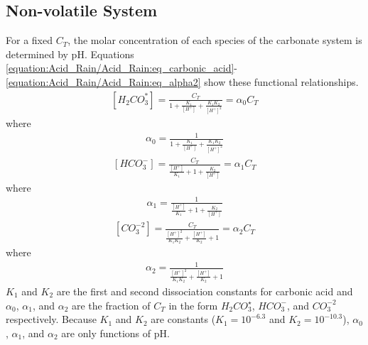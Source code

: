 \documentclass[letterpaper,10pt,english]{sphinxmanual}
\begin{document}
\subsection{Non-volatile System}
\label{\detokenize{Acid_Rain/Acid_Rain:non-volatile-system}}
For a fixed \(C_T\), the molar concentration of each species of the carbonate system is determined by pH. Equations \eqref{equation:Acid_Rain/Acid_Rain:eq_carbonic_acid}-\eqref{equation:Acid_Rain/Acid_Rain:eq_alpha2} show these functional relationships.
\begin{equation}\label{equation:Acid_Rain/Acid_Rain:eq_carbonic_acid}
\begin{split}\left[H_2 {CO}_3^* \right] = \frac{C_T}{1+\frac{K_1}{[H^+]} +\frac{K_1 K_2}{[H^+]^2} } = \alpha_0 C_T\end{split}
\end{equation}
where
\begin{equation}\label{equation:Acid_Rain/Acid_Rain:eq_alpha0}
\begin{split}\alpha_0 =\frac{1}{1+\frac{K_1 }{[H^+]} +\frac{K_1 K_2}{[H^+]^2} }\end{split}
\end{equation}\begin{equation}\label{equation:Acid_Rain/Acid_Rain:eq_bicarbonate}
\begin{split}\left[{HCO}_3^- \right]=\frac{C_T}{\frac{[H^+ ]}{K_1 } +1+ \frac{K_2}{[H^+]}} =\alpha_1 C_T\end{split}
\end{equation}
where
\begin{equation}\label{equation:Acid_Rain/Acid_Rain:eq_alpha1}
\begin{split}\alpha_1 = \frac{1}{\frac{[H^+]}{K_1} + 1 + \frac{K_2}{[H^+]}}\end{split}
\end{equation}\begin{equation}\label{equation:Acid_Rain/Acid_Rain:eq_carbonate}
\begin{split}\left[{CO}_3^{-2} \right] = \frac{C_T}{\frac{[H^+]^2}{K_1 K_2} +\frac{[H^+]}{K_2} +1 } =\alpha_2 C_T\end{split}
\end{equation}
where
\begin{equation}\label{equation:Acid_Rain/Acid_Rain:eq_alpha2}
\begin{split}\alpha_2 = \frac{1}{\frac{[H^+]^2 }{K_1 K_2} +\frac{[H^+]}{K_2} + 1}\end{split}
\end{equation}
\(K_1\) and \(K_2\) are the first and second dissociation constants for carbonic acid and \(\alpha_0\), \(\alpha_1\), and \(\alpha_2\) are the fraction of \(C_T\) in the form \(H_2CO_3^\star\), \(HCO_3^-\), and \(CO_3^{-2}\) respectively. Because \(K_1\) and \(K_2\) are constants (\(K_1 = 10^{-6.3}\) and \(K_2 = 10^{-10.3}\)), \(\alpha_0\), \(\alpha_1\), and \(\alpha_2\) are only functions of pH.
\end{document}
